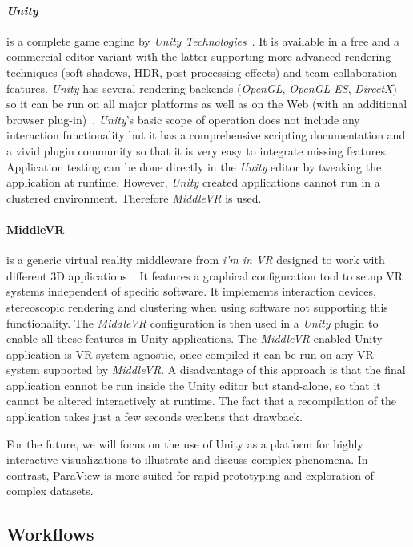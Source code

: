 \documentclass[twocolumn]{svjour3}          %
\begin{document}
\paragraph{\emph{Unity}}
is a complete game engine by \emph{Unity Technologies}~\cite{goldstone:unity3d}. It is available in a free and a commercial editor variant with the latter supporting more advanced rendering techniques (soft shadows, HDR, post-processing effects) and team collaboration features. \emph{Unity} has several rendering backends (\emph{OpenGL}, \emph{OpenGL ES}, \emph{DirectX}) so it can be run on all major platforms as well as on the Web (with an additional browser plug-in)~\cite{web:unity}. \emph{Unity}'s basic scope of operation does not include any interaction functionality but it has a comprehensive scripting documentation and a vivid plugin community so that it is very easy to integrate missing features. Application testing can be done directly in the \emph{Unity} editor by tweaking the application at runtime. However, \emph{Unity} created applications cannot run in a clustered environment. Therefore \emph{MiddleVR} is used.

\paragraph{MiddleVR}
is a generic virtual reality middleware from \emph{i'm in VR} designed to work with different 3D applications~\cite{web:middlevr}. It features a graphical configuration tool to setup VR systems independent of specific software. It implements interaction devices, stereoscopic rendering and clustering when using software not supporting this functionality. The \emph{MiddleVR} configuration is then used in a \emph{Unity} plugin to enable all these features in Unity applications. The \emph{MiddleVR}-enabled Unity application is VR system agnostic, once compiled it can be run on any VR system supported by \emph{MiddleVR}. A disadvantage of this approach is that the final application cannot be run inside the Unity editor but stand-alone, so that it cannot be altered interactively at runtime. The fact that a recompilation of the application takes just a few seconds weakens that drawback.

For the future, we will focus on the use of Unity as a platform for highly interactive visualizations to illustrate and discuss complex phenomena. In contrast, ParaView is more suited for rapid prototyping and exploration of complex datasets.

\subsection{Workflows}
\label{workflows}
\end{document}
